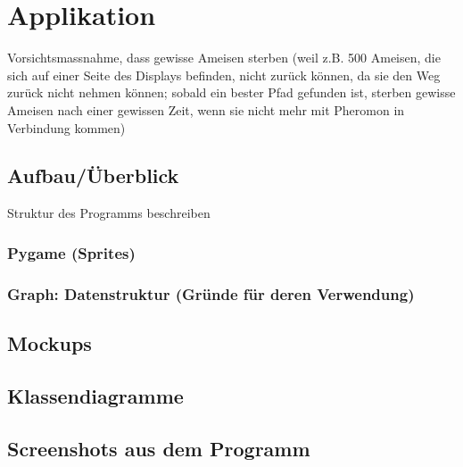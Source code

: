 
\chapter{Applikation}



Vorsichtsmassnahme, dass gewisse Ameisen sterben (weil z.B. 500 Ameisen, die sich auf einer Seite des Displays befinden, nicht zurück können, da sie den Weg zurück nicht nehmen können; sobald ein bester Pfad gefunden ist, sterben gewisse Ameisen nach einer gewissen Zeit, wenn sie nicht mehr mit Pheromon in Verbindung kommen) \\


\section*{Aufbau/Überblick}

Struktur des Programms beschreiben \\


\vspace*{1cm}

\subsection*{Pygame (Sprites)}


\vspace*{1cm}


\subsection*{Graph: Datenstruktur (Gründe für deren Verwendung)}


\vspace*{1cm}


\section{Mockups}


\vspace*{1cm}



\section{Klassendiagramme}


\vspace*{1cm}


\section{Screenshots aus dem Programm}


